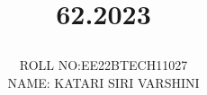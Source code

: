 \documentclass[journal,12pt,twocolumn]{IEEEtran}
\theoremstyle{remark}
\begin{document}
\let\vec\mathbf




\vspace{3cm}

\title{

\textbf{62.2023} 

}
\author{ ROLL NO:EE22BTECH11027\\
         NAME: KATARI SIRI VARSHINI
	}
	
	

\maketitle

\newpage


\bigskip
\end{document}

